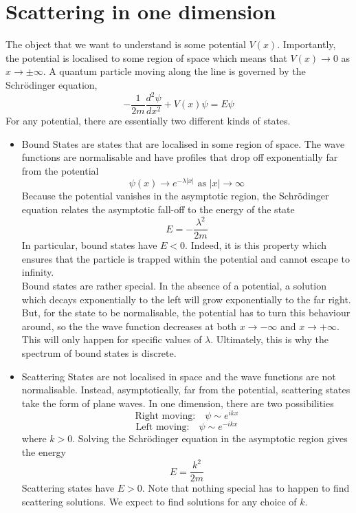 \section{Scattering in one dimension}
The object that we want to understand is some potential $V(x)$. Importantly, the potential is localised to some
region of space which means that $V (x) \to 0$ as $x \to \pm \infty$.
A quantum particle moving along the line is governed by the Schr\"{o}dinger equation,
\[-\frac{1}{2m}\frac{d^2\psi}{dx^2} + V(x)\psi = E\psi\]
For any potential, there are essentially two different kinds of states.
\begin{itemize}
\item Bound States are states that are localised in some region of space. The wave functions are normalisable and have profiles that drop off exponentially far from the
potential 
\[\psi(x) \to e^{-\lambda|x|} \mbox{ as } |x| \to \infty\]
Because the potential vanishes in the asymptotic region, the Schr\"{o}dinger equation relates the asymptotic fall-off to the energy of the state
\[E = -\frac{\lambda^2}{2m}\]
In particular, bound states have $E < 0$. Indeed, it is this property which ensures that the particle is trapped within the potential and cannot escape to infinity.
\\
Bound states are rather special. In the absence of a potential, a solution which decays exponentially to the left will grow exponentially to the far right. 
But, for the state to be normalisable, the potential has to turn this behaviour around, so the the wave function decreases at both $x \to -\infty$ and $x \to +\infty$. 
This will only happen for specific values of $\lambda$. Ultimately, this is why the spectrum of bound states is discrete.
\item Scattering States are not localised in space and the wave functions are not normalisable. 
Instead, asymptotically, far from the potential, scattering states take the form of plane waves. In one dimension, there are two possibilities
\[\mbox{Right moving:} \quad \psi \sim e^{ikx}\]
\[\mbox{Left moving:} \quad \psi \sim e^{-ikx}\]
where $k > 0$. Solving the Schr\"{o}dinger equation in the asymptotic region gives the energy
\[E = \frac{k^2}{2m}\]
Scattering states have $E > 0$. Note that nothing special has to happen to find scattering solutions. We expect to find solutions for any choice of $k$.
\end{itemize}

